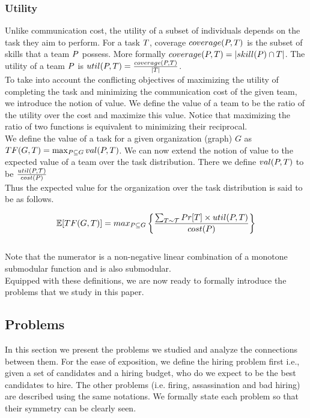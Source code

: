 \subsubsection{Utility}
Unlike communication cost, the utility of a subset of individuals depends on the task they aim to perform. 
For a task $T$, coverage $coverage(P,T)$ is the subset of skills that a team $P$ possess.
More formally $coverage(P,T) = |skill(P) \cap T|$.
The utility of a team $ P $ is ${util}(P,T) = \frac{coverage(P, T)}{|T|}$.\\
To take into account the conflicting objectives of maximizing the utility of completing the task and minimizing the communication cost of the given team, we introduce the notion of value. We define the value of a team to be the ratio of the utility over the cost and maximize this value. Notice that maximizing the ratio of two functions is equivalent to minimizing their reciprocal. \\
We define the value of a task for a given organization (graph) $G$ as $TF(G,T) = \max_{P \subseteq G}{val(P,T)}$. We can now extend the notion of value to the expected value of a team over the task distribution. There we define $val(P,T)$ to be $\frac{{util}(P,\mathcal{T})}{cost(P)} $ \\
Thus the expected value for the organization over the task distribution is said to be as follows.

$$\mathbb{E}[TF(G,T)] = max_{P \subseteq G} \left\{ \frac{\sum_{T \sim \mathcal{T} } Pr[T] \times {util}(P, T)} {cost(P)} \right\} $$ \\
Note that the numerator is a non-negative linear combination of a monotone submodular function and is also submodular.\\
Equipped with these definitions, we are now ready to formally introduce the problems that we study in this paper.

\subsection{Problems}

In this section we present the problems we studied and analyze the connections between them. For the ease of exposition, we define the hiring problem first i.e., given a set of candidates and a hiring budget, who do we expect to be the best candidates to hire. The other problems (i.e. firing, assassination and bad hiring) are described using the same notations. We formally state each problem so that their symmetry can be clearly seen.

